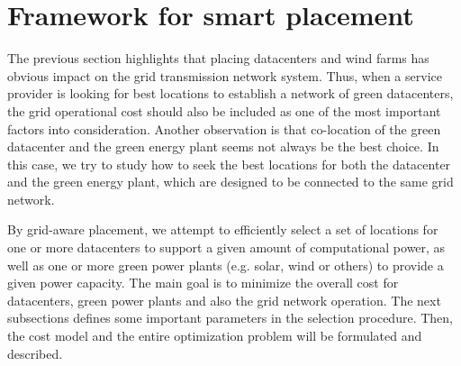 \section{Framework for smart placement}
\label{sec:framework}

The previous section highlights that placing datacenters and wind
farms has obvious impact on the grid transmission network system. Thus,
when a service provider is looking for best locations to establish a
network of green datacenters, the grid operational cost should also
be included as one of the most important factors into
consideration. Another observation is that co-location of the green
datacenter and the green energy plant seems not always be the best
choice. In this case, we try to study how to seek the best locations
for both the datacenter and the green energy plant, which are
designed to be connected to the same grid network.

By grid-aware placement, we attempt to efficiently select a set of locations for one or more datacenters to support a given amount of computational power, as well as one or more green power plants (e.g. solar, wind or others) to provide a given power capacity. The main goal is to minimize the overall cost for datacenters, green power plants and also the grid network operation. The next subsections defines some important parameters in the selection procedure. Then, the cost model and the entire optimization problem will be formulated and described.

